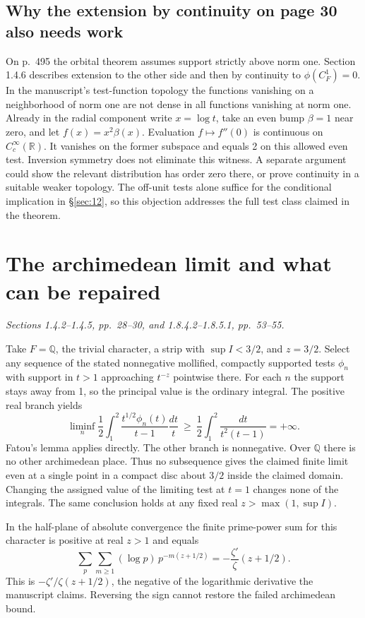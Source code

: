 \documentclass[11pt,reqno]{amsart}
\numberwithin{equation}{section}
\newcommand{\Q}{\mathbb Q}\newcommand{\R}{\mathbb R}\newcommand{\C}{\mathbb C}\newcommand{\Z}{\mathbb Z}
\begin{document}
\subsection*{Why the extension by continuity on page 30 also needs work}
On p.~495 the orbital theorem assumes support strictly above norm one. Section 1.4.6 describes extension to the other side and then by continuity to \(\phi(C_F^1)=0\). In the manuscript's test-function topology the functions vanishing on a neighborhood of norm one are not dense in all functions vanishing at norm one. Already in the radial component write \(x=\log t\), take an even bump \(\beta=1\) near zero, and let \(f(x)=x^2\beta(x)\). Evaluation \(f\mapsto f''(0)\) is continuous on \(C_c^\infty(\R)\). It vanishes on the former subspace and equals 2 on this allowed even test. Inversion symmetry does not eliminate this witness. A separate argument could show the relevant distribution has order zero there, or prove continuity in a suitable weaker topology. The off-unit tests alone suffice for the conditional implication in \S\ref{sec:12}, so this objection addresses the full test class claimed in the theorem.


\section{The archimedean limit and what can be repaired}\label{sec:10}

\textit{Sections 1.4.2--1.4.5, pp.~28--30, and 1.8.4.2--1.8.5.1, pp.~53--55.}\par
Take \(F=\Q\), the trivial character, a strip with \(\sup I<3/2\), and \(z=3/2\). Select any sequence of the stated nonnegative mollified, compactly supported tests \(\phi_n\) with support in \(t>1\) approaching \(t^{-z}\) pointwise there. For each \(n\) the support stays away from 1, so the principal value is the ordinary integral. The positive real branch yields
\[
  \liminf_n\frac12\int_1^2\frac{t^{1/2}\phi_n(t)}{t-1}\frac{dt}{t}
       \ \ge\ \frac12\int_1^2\frac{dt}{t^2(t-1)}=+\infty .
\]
Fatou's lemma applies directly. The other branch is nonnegative. Over \(\Q\) there is no other archimedean place. Thus no subsequence gives the claimed finite limit even at a single point in a compact disc about \(3/2\) inside the claimed domain. Changing the assigned value of the limiting test at \(t=1\) changes none of the integrals. The same conclusion holds at any fixed real \(z>\max(1,\sup I)\).

In the half-plane of absolute convergence the finite prime-power sum for this character is positive at real \(z>1\) and equals
\[
    \sum_p\sum_{m\ge1}(\log p)\,p^{-m(z+1/2)}
        =-\frac{\zeta'}{\zeta}(z+1/2).
\]
This is \(-\zeta'/\zeta(z+1/2)\), the negative of the logarithmic derivative the manuscript claims. Reversing the sign cannot restore the failed archimedean bound.
\end{document}
